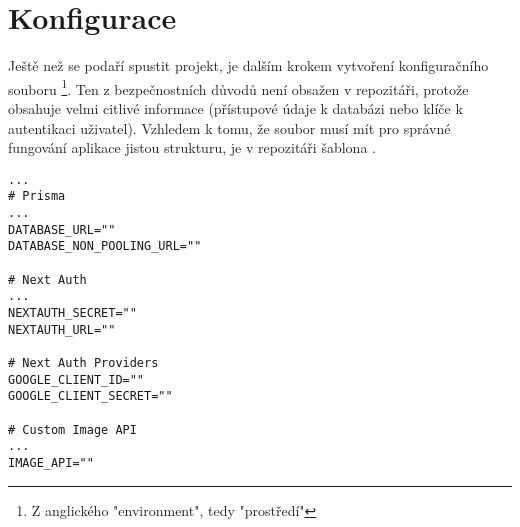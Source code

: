 \section{Konfigurace}
Ještě než se podaří spustit projekt, je dalším krokem vytvoření konfiguračního souboru \footnote{Z anglického "environment", tedy "prostředí"}. Ten z bezpečnostních důvodů není obsažen v repozitáři, protože obsahuje velmi citlivé informace (přístupové údaje k databázi nebo klíče k autentikaci uživatel). Vzhledem k tomu, že  soubor musí mít pro správné fungování aplikace jistou strukturu, je v repozitáři šablona .
\begin{lstlisting}[caption=Šablona konfiguračního souboru .env]
...
# Prisma
...
DATABASE_URL=""
DATABASE_NON_POOLING_URL=""

# Next Auth
...
NEXTAUTH_SECRET=""
NEXTAUTH_URL=""

# Next Auth Providers
GOOGLE_CLIENT_ID=""
GOOGLE_CLIENT_SECRET=""

# Custom Image API
...
IMAGE_API=""
\end{lstlisting}
